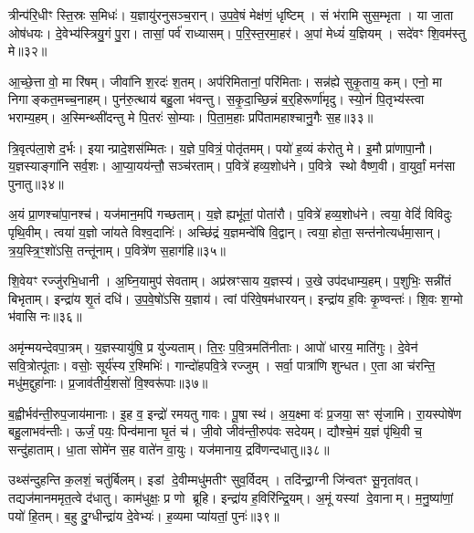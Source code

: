त्रीन्प॑रि॒धीꣳ स्ति॒स्रः स॒मिधः॑।
य॒ज्ञायु॑रनुसञ्च॒रान्।
उ॒प॒वे॒षं मेक्ष॑णं॒ धृष्टिम्।
सं भ॑रामि सुस॒म्भृता।
या जा॒ता ओष॑धयः।
दे॒वेभ्य॑स्त्रियु॒गं पु॒रा।
तासां॒ पर्व॑ राध्यासम्।
प॒रि॒स्त॒रमा॒हर\sn{}॑।
अ॒पां मेध्यं॑ य॒ज्ञियम्।
सदे॑वꣳ शि॒वम॑स्तु मे॥३२॥

आ॒च्छे॒त्ता वो॒ मा रि॑षम्।
जीवा॑नि श॒रदः॑ श॒तम्।
अप॑रिमितानां॒ परि॑मिताः।
सन्न॑ह्ये सुकृ॒ताय॒ कम्।
एनो॒ मा निगाङ्कत॒मच्च॒नाहम्।
पुन॑रु॒त्थाय॑ बहु॒ला भ॑वन्तु।
स॒कृ॒दा॒च्छि॒न्नं ब॒र्॒हिरूर्णा॑मृदु।
स्यो॒नं पि॒तृभ्य॑स्त्वा भराम्य॒हम्।
अ॒स्मिन्थ्सी॑दन्तु मे पि॒तरः॑ सो॒म्याः।
पि॒ता॒म॒हाः प्रपि॑तामहाश्चानु॒गैः स॒ह॥३३॥

त्रि॒वृत्प॑ला॒शे द॒र्भः।
इयान्प्रादे॒शस॑म्मितः।
य॒ज्ञे प॒वित्रं॒ पोतृ॑तमम्।
पयो॑ ह॒व्यं क॑रोतु मे।
इ॒मौ प्रा॑णापा॒नौ।
य॒ज्ञस्याङ्गा॑नि सर्व॒शः।
आ॒प्या॒यय॑न्तौ॒ सञ्च॑रताम्।
प॒वित्रे॑ हव्य॒शोध॑ने।
प॒वित्रे स्थो वैष्ण॒वी।
वा॒युर्वां॒ मन॑सा पुनातु॥३४॥

अ॒यं प्रा॒णश्चा॑पा॒नश्च॑।
यज॑मान॒मपि॑ गच्छताम्।
य॒ज्ञे ह्यभू॑तां॒ पोता॑रौ।
प॒वित्रे॑ हव्य॒शोध॑ने।
त्वया॒ वेदिं॑ विविदुः पृथि॒वीम्।
त्वया॑ य॒ज्ञो जा॑यते विश्व॒दानिः॑।
अच्छि॑द्रं य॒ज्ञमन्वे॑षि वि॒द्वान्।
त्वया॒ होता॒ सन्त॑नोत्यर्धमा॒सान्।
त्र॒य॒स्त्रि॒ꣳ॒शो॑ऽसि॒ तन्तू॑नाम्।
प॒वित्रे॑ण स॒हाग॑हि॥३५॥

शि॒वेयꣳ रज्जु॑रभि॒धानी।
अ॒घ्नि॒यामुप॑ सेवताम्।
अप्र॑स्रꣳसाय य॒ज्ञस्य॑।
उ॒खे उप॑दधाम्य॒हम्।
प॒शुभिः॒ सन्नी॑तं बिभृताम्।
इन्द्रा॑य शृ॒तं दधि॑।
उ॒प॒वे॒षो॑ऽसि य॒ज्ञाय॑।
त्वां प॑रिवे॒षम॑धारयन्।
इन्द्रा॑य ह॒विः कृ॒ण्वन्तः॑।
शि॒वः श॒ग्मो भ॑वासि नः॥३६॥

अमृ॑न्मयन्देवपा॒त्रम्।
य॒ज्ञस्यायु॑षि॒ प्र यु॑ज्यताम्।
ति॒रः॒ प॒वि॒त्रमति॑नीताः।
आपो॑ धारय॒ माति॑गुः।
दे॒वेन॑ सवि॒त्रोत्पू॑ताः।
वसोः॒ सूर्य॑स्य र॒श्मिभिः॑।
गान्दो॑हपवि॒त्रे रज्जुम्।
सर्वा॒ पात्रा॑णि शुन्धत।
ए॒ता आ च॑रन्ति॒ मधु॑म॒द्दुहा॑नाः।
प्र॒जाव॑तीर्य॒शसो॑ वि॒श्वरू॑पाः॥३७॥

ब॒ह्वीर्भव॑न्ती॒रुप॒जाय॑मानाः।
इ॒ह व॒ इन्द्रो॑ रमयतु गावः।
पू॒षा स्थ॑।
अ॒य॒क्ष्मा वः॑ प्र॒जया॒ सꣳ सृ॑जामि।
रा॒यस्पोषे॑ण बहु॒लाभव॑न्तीः।
ऊर्जं॒ पयः॒ पिन्व॑माना घृ॒तं च॑।
जी॒वो जीव॑न्ती॒रुप॑वः सदेयम्।
द्यौश्चे॒मं य॒ज्ञं पृ॑थि॒वी च॒ सन्दु॑हाताम्।
धा॒ता सोमे॑न स॒ह वाते॑न वा॒युः।
यज॑मानाय॒ द्रवि॑णन्दधातु॥३८॥

उथ्स॑न्दुहन्ति क॒लशं॒ चतु॑र्बिलम्।
इडां दे॒वीम्मधु॑मतीꣳ सुव॒र्विदम्।
तदि॑न्द्रा॒ग्नी जि॑न्वतꣳ सू॒नृता॑वत्।
तद्यज॑मानममृत॒त्वे द॑धातु।
काम॑धुक्षः॒ प्र णो ब्रूहि।
इन्द्रा॑य ह॒विरि॑न्द्रि॒यम्।
अ॒मूं यस्यां दे॒वानाम्।
म॒नु॒ष्या॑णां॒ पयो॑ हि॒तम्।
ब॒हु दु॒ग्धीन्द्रा॑य दे॒वेभ्यः॑।
ह॒व्यमा प्या॑यतां॒ पुनः॑॥३९॥

